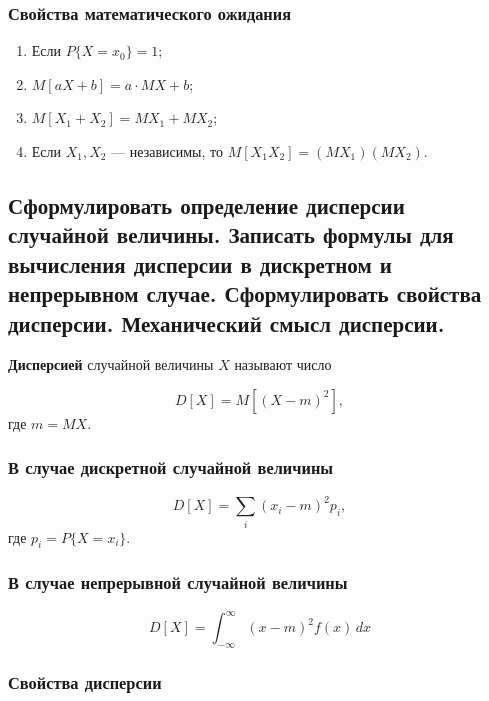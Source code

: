 \subsubsection*{Свойства математического ожидания}

\begin{enumerate}
	\item Если $P\{X = x_{0}\} = 1$;
	\item $M[aX + b] = a \cdot MX + b$;
	\item $M[X_{1} + X_{2}] = MX_{1} + MX_{2}$;
	\item Если $X_{1}, X_{2}$ --- независимы, то $M[X_{1}X_{2}] = (MX_{1})(MX_{2})$.
\end{enumerate}

\subsection{Сформулировать определение дисперсии случайной величины. Записать формулы для вычисления дисперсии в дискретном и непрерывном случае. Сформулировать свойства дисперсии. Механический смысл дисперсии.}

\textbf{Дисперсией} случайной величины $X$ называют число

\begin{equation}
	D[X] = M[(X - m)^{2}],
\end{equation}
где $m = MX$.

\subsubsection*{В случае дискретной случайной величины}

\begin{equation}
	D[X] = \sum_{i}(x_{i} - m)^{2}p_{i},
\end{equation}
где $p_{i} = P\{X = x_{i}\}$.

\subsubsection*{В случае непрерывной случайной величины}

\begin{equation}
	D[X] = \int_{-\infty}^{\infty}(x - m)^{2}f(x)\,dx
\end{equation}

\subsubsection*{Свойства дисперсии}

